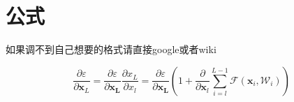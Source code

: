 \section{公式}

如果调不到自己想要的格式请直接google或者wiki

\begin{equation}
\label{equa:example_equa}
\frac{\partial{\varepsilon}}{\partial{\bm{x}_L}} =
\frac{\partial \varepsilon}{\partial \bm{x_L}}\frac{\partial x_L}{\partial x_l} =
\frac{\partial \varepsilon}{\partial \bm{x_L}}(1 + \frac{\partial }{\partial \bm{x}_l}\sum_{i=l}^{L-1} \mathcal{F}(\bm{x}_i, \mathcal{W}_i))
\end{equation}
